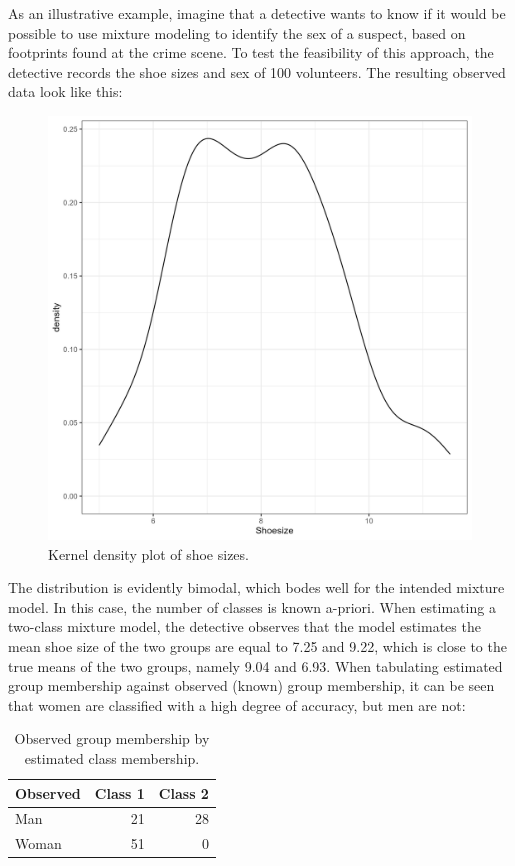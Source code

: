 \documentclass[
  ,man,floatsintext]{apa6}
\begin{document}
As an illustrative example, imagine that a detective wants to know
if it would be possible to use mixture modeling to identify the sex of a suspect,
based on footprints found at the crime scene.
To test the feasibility of this approach,
the detective records the shoe sizes and sex of 100 volunteers.
The resulting observed data look like this:

\begin{figure}
\includegraphics[width=7in]{shoedens} \caption{Kernel density plot of shoe sizes.}\label{fig:shoedens}
\end{figure}

The distribution is evidently bimodal, which bodes well for the intended mixture model.
In this case, the number of classes is known a-priori.
When estimating a two-class mixture model, the detective observes that the model estimates
the mean shoe size of the two groups are equal to 7.25
and 9.22,
which is close to the true means of the two groups,
namely 9.04 and 6.93.
When tabulating estimated group membership against observed (known) group membership,
it can be seen that women are classified with a high degree of accuracy, but men are not:

\begin{table}

\caption{\label{tab:tabshoe}Observed group membership by estimated class membership.}
\centering
\begin{tabular}[t]{l|r|r}
\hline
Observed & Class 1 & Class 2\\
\hline
Man & 21 & 28\\
\hline
Woman & 51 & 0\\
\hline
\end{tabular}
\end{table}
\end{document}
